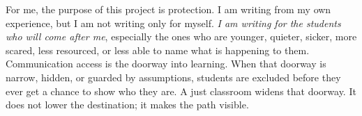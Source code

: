 For me, the purpose of this project is protection. I am writing from my own experience, but I am not writing only for myself. \textit{I am writing for the students who will come after me}, especially the ones who are younger, quieter, sicker, more scared, less resourced, or less able to name what is happening to them. Communication access is the doorway into learning. When that doorway is narrow, hidden, or guarded by assumptions, students are excluded before they ever get a chance to show who they are. A just classroom widens that doorway. It does not lower the destination; it makes the path visible.
